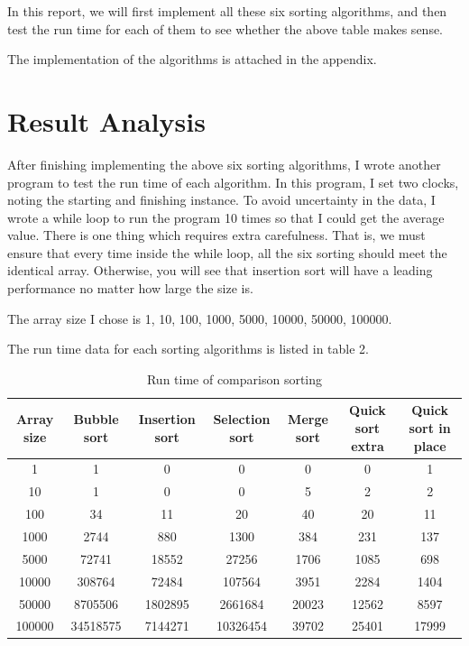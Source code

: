 \documentclass{article}
\begin{document}
\begin{spacing}{2.0}
In this report, we will first implement all these six sorting algorithms, and then test the run time for each of them to see whether the above table makes sense.

The implementation of the algorithms is attached in the appendix.
\section{Result Analysis}
\indent After finishing implementing the above six sorting algorithms, I wrote another program to test the run time of each algorithm. In this program, I set two clocks, noting the starting and finishing instance. To avoid uncertainty in the data, I wrote a while loop to run the program 10 times so that I could get the average value. There is one thing which requires extra carefulness. That is, we must ensure that every time inside the while loop, all the six sorting should meet the identical array. Otherwise, you will see that insertion sort will have a leading performance no matter how large the size is.

The array size I chose is 1, 10, 100, 1000, 5000, 10000, 50000, 100000.

The run time data for each sorting algorithms is listed in table 2.
\begin{table}[!h]
\centering
\begin{tabular}{c|cccccc}
Array size&Bubble sort&Insertion sort&Selection sort&Merge sort&Quick sort extra&Quick sort in place\\
\hline
\hline
1&1&0&0&0&0&1\\
\hline
10&1&0&0&5&2&2\\
\hline
100&34&11&20&40&20&11\\
\hline
1000&2744&880&1300&384&231&137\\
\hline
5000&72741&18552&27256&1706&1085&698\\
\hline
10000&308764&72484&107564&3951&2284&1404\\
\hline
50000&8705506&1802895&2661684&20023&12562&8597\\
\hline
100000&34518575&7144271&10326454&39702&25401&17999\\
\hline
\end{tabular}
\caption{Run time of comparison sorting}
\end{table}


\end{spacing}
\end{document}

